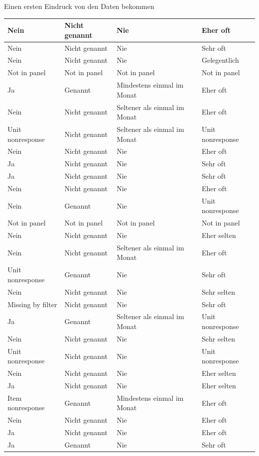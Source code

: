 \documentclass[ignorenonframetext,]{beamer}
\begin{document}
\begin{frame}{Einen ersten Eindruck von den Daten bekommen}
\begin{tabular}{l|l|l|l}
\hline
Nein & Nicht genannt & Nie & Eher oft\\
\hline
Nein & Nicht genannt & Nie & Sehr oft\\
\hline
Nein & Nicht genannt & Nie & Gelegentlich\\
\hline
Not in panel & Not in panel & Not in panel & Not in panel\\
\hline
Ja & Genannt & Mindestens einmal im Monat & Eher oft\\
\hline
Nein & Nicht genannt & Seltener als einmal im Monat & Eher oft\\
\hline
Unit nonresponse & Nicht genannt & Seltener als einmal im Monat & Unit nonresponse\\
\hline
Nein & Nicht genannt & Nie & Eher oft\\
\hline
Ja & Nicht genannt & Nie & Sehr oft\\
\hline
Ja & Nicht genannt & Nie & Sehr oft\\
\hline
Nein & Nicht genannt & Nie & Eher oft\\
\hline
Nein & Genannt & Nie & Unit nonresponse\\
\hline
Not in panel & Not in panel & Not in panel & Not in panel\\
\hline
Nein & Nicht genannt & Nie & Eher selten\\
\hline
Nein & Nicht genannt & Seltener als einmal im Monat & Eher oft\\
\hline
Unit nonresponse & Genannt & Nie & Sehr oft\\
\hline
Nein & Nicht genannt & Nie & Sehr selten\\
\hline
Missing by filter & Nicht genannt & Nie & Sehr oft\\
\hline
Ja & Genannt & Seltener als einmal im Monat & Unit nonresponse\\
\hline
Nein & Nicht genannt & Nie & Sehr selten\\
\hline
Unit nonresponse & Nicht genannt & Nie & Unit nonresponse\\
\hline
Nein & Nicht genannt & Nie & Eher selten\\
\hline
Ja & Nicht genannt & Nie & Eher selten\\
\hline
Item nonresponse & Genannt & Mindestens einmal im Monat & Eher oft\\
\hline
Nein & Nicht genannt & Nie & Eher oft\\
\hline
Ja & Nicht genannt & Nie & Eher oft\\
\hline
Ja & Genannt & Nie & Sehr oft\\
\hline

\end{tabular}
\end{frame}
\end{document}
